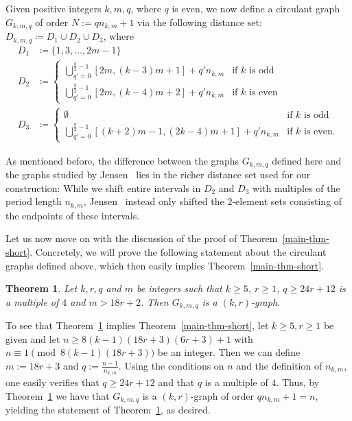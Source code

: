 \documentclass[a4paper,10pt,hidelinks]{amsart}
\newtheorem{theorem}{Theorem}[section]
\theoremstyle{definition}
\begin{document}
    Given positive integers $k, m, q$, where $q$ is even, we now define a circulant graph $G_{k,m,q}$ of order $N := qn_{k,m} + 1$ via the following distance set: $D_{k, m, q} \coloneqq D_1 \cup D_2 \cup D_3$, where
    \begin{align*}
        D_1 &\coloneqq \{1, 3, \dots, 2m - 1\}\\
        D_2 &\coloneqq \begin{cases}
            \bigcup\limits_{q' = 0}^{\frac{q}{2} - 1} [2m, (k-3)m + 1] + q'n_{k, m} & \text{if } k \text{ is odd}\\
            \bigcup\limits_{q' = 0}^{\frac{q}{2} - 1} [2m, (k - 4)m + 2] + q'n_{k, m} & \text{if } k \text{ is even}
        \end{cases}\\
        D_3 &\coloneqq \begin{cases}
            \emptyset & \text{if } k \text{ is odd}\\
            \bigcup\limits_{q' = 0}^{\frac{q}{2} - 1} [(k + 2)m - 1, (2k - 4)m + 1] + q'n_{k,m} & \text{if } k \text{ is even}.
        \end{cases}
    \end{align*}
    
    As mentioned before, the difference between the graphs $G_{k,m,q}$ defined here and the graphs studied by Jensen~\cite{jensen} lies in the richer distance set used for our construction: While we shift entire intervals in $D_2$ and $D_3$ with multiples of the period length $n_{k,m}$, Jensen~\cite{jensen} instead only shifted the $2$-element sets consisting of the endpoints of these intervals.

Let us now move on with the discussion of the proof of Theorem~\ref{main-thm-short}. Concretely, we will prove the following statement about the circulant graphs defined above, which then easily implies Theorem~\ref{main-thm-short}.
    \begin{theorem}\label{main-thm}
    Let $k , r, q$ and $m$ be integers such that $k\ge 5$, $r\ge 1$, $q \geq 24r + 12$ is a multiple of $4$ and $m > 18r+2$. Then $G_{k, m, q}$ is a $(k,r)$-graph.
    \end{theorem}

    To see that Theorem~\ref{main-thm} implies Theorem~\ref{main-thm-short}, let $k\ge 5, r\ge 1$ be given and let $n\ge 8(k-1)(18r+3)(6r+3)+1$ with $n\equiv 1 \pmod{8(k-1)(18r+3)}$ be an integer. Then we can define $m:=18r+3$ and $q:=\frac{n-1}{n_{k,m}}$. Using the conditions on $n$ and the definition of $n_{k,m}$, one easily verifies that $q\ge 24r+12$ and that $q$ is a multiple of $4$. Thus, by Theorem~\ref{main-thm} we have that $G_{k,m,q}$ is a $(k,r)$-graph of order $qn_{k,m}+1=n$, yielding the statement of Theorem~\ref{main-thm}, as desired.
\end{document}
